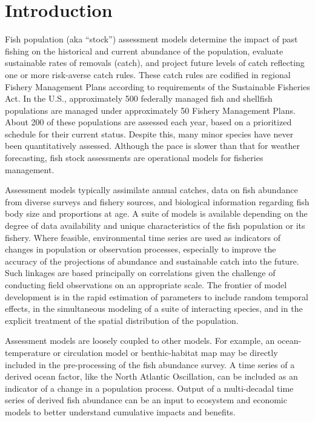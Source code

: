 
\section{Introduction}\label{sec:intro}

Fish population (aka ``stock'')  assessment models determine the impact of past fishing on the historical and current abundance of the population, evaluate sustainable rates of removals (catch), and project future levels of catch reflecting one or more risk-averse catch rules.  These catch rules are codified in regional Fishery Management Plans according to requirements of the Sustainable Fisheries Act.  In the U.S., approximately 500 federally managed fish and shellfish populations are managed under approximately 50 Fishery Management Plans.  About 200 of these populations are assessed each year, based on a prioritized schedule for their current status. Despite this, many minor species have never been quantitatively assessed.  Although the pace is slower than that for weather forecasting, fish stock assessments are operational models for fisheries management.

Assessment models typically assimilate annual catches, data on fish abundance from diverse surveys and fishery sources, and biological information regarding fish body size and proportions at age.  A suite of models is available depending on the degree of data availability and unique characteristics of the fish population or its fishery.  Where feasible, environmental time series are used as indicators of changes in population or observation processes, especially to improve the accuracy of the projections of abundance and sustainable catch into the future.  Such linkages are based principally on correlations given the challenge of conducting field observations on an appropriate scale.  The frontier of model development is in the rapid estimation of parameters to include random temporal effects, in the simultaneous modeling of a suite of interacting species, and in the explicit treatment of the spatial distribution of the population.

Assessment models are loosely coupled to other models. For example, an ocean-temperature or circulation model or benthic-habitat map may be directly included in the pre-processing of the fish abundance survey.  A time series of a derived ocean factor, like the North Atlantic Oscillation, can be included as an indicator of a change in a population process.  Output of a multi-decadal time series of derived fish abundance can be an input to ecosystem and economic models to better understand cumulative impacts and benefits. 

